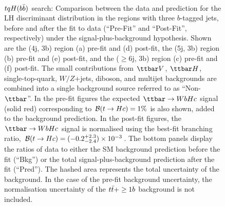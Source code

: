 \begin{figure}[htbp]
\begin{center}
 \\
\caption{\small{$tqH(b\bar{b})$ search: Comparison between the data and prediction for the LH discriminant distribution in the regions with three $b$-tagged jets, 
before and after the fit to data  (``Pre-Fit'' and ``Post-Fit'', respectively) under the signal-plus-background hypothesis.
Shown are the (4j, 3b) region (a) pre-fit and (d) post-fit,  the (5j, 3b) region (b) pre-fit and (e) post-fit, and
the ($\geq$6j, 3b) region (c) pre-fit and (f) post-fit.
The small contributions from $\ttbar V$, $\ttbar H$, single-top-quark, $W/Z$+jets, diboson, and multijet backgrounds are combined into a single background source 
referred to as ``Non-$\ttbar$''. 
In the pre-fit figures the expected $\Hc$ signal (solid red) corresponding to $\mathcal{B}(t\to Hc)=1\%$ is also shown,
added to the background prediction. In the post-fit figures, the $\Hc$ signal is normalised using the best-fit branching ratio, 
$\mathcal{B}(t\to Hc)=(-0.2^{+2.3}_{-2.4}) \times 10^{-3}$.
The bottom panels display the ratios of data to either the SM background prediction before the fit (``Bkg'')  or the total signal-plus-background
prediction after the fit (``Pred''). 
The hashed area represents the total uncertainty of the background.
In the case of the pre-fit background uncertainty, the normalisation uncertainty of the $t\bar{t}+\geq1b$ background is not included. }}
\label{fig:prepostfit_unblinded_WbHc_3btagex}
\end{center}
\end{figure}

